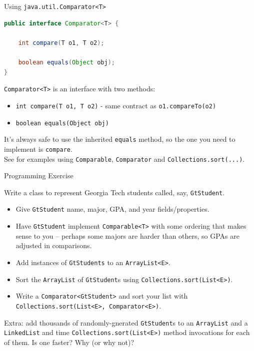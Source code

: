 \documentclass{beamer}
\begin{document}
\begin{frame}[fragile]{Using {\tt java.util.Comparator<T>}}


\begin{lstlisting}[language=Java]
public interface Comparator<T> {

    int compare(T o1, T o2);

    boolean equals(Object obj);
}

\end{lstlisting}

{\tt Comparator<T>} is an interface with two methods:
\begin{itemize}
\item {\tt int compare(T o1, T o2)} -  same contract as {\tt o1.compareTo(o2)}
\item {\tt boolean equals(Object obj)}
\end{itemize}
It's always safe to use the inherited {\tt equals} method, so the one you need to implement is {\tt compare}.\\

See  for examples using {\tt Comparable}, {\tt Comparator} and {\tt Collections.sort(...)}.

\end{frame}


\begin{frame}[fragile]{Programming Exercise}

Write a class to represent Georgia Tech students called, say, {\tt GtStudent}.
\begin{itemize}
\item Give {\tt GtStudent} name, major, GPA, and year fields/properties.
\item Have {\tt GtStudent} implement {\tt Comparable<T>} with some ordering that makes sense to you -- perhaps some majors are harder than others, so GPAs are adjusted in comparisons.
\item Add instances of {\tt GtStudents} to an {\tt ArrayList<E>}.
\item Sort the {\tt ArrayList} of {\tt GtStudent}s using {\tt Collections.sort(List<E>)}.
\item Write a {\tt Comparator<GtStudent>} and sort your list with {\tt Collections.sort(List<E>, Comparator<E>)}.
\end{itemize}
Extra: add thousands of randomly-gnerated {\tt GtStudent}s to an {\tt ArrayList} and a {\tt LinkedList} and time {\tt Collections.sort(List<E>)} method invocations for each of them.  Is one faster?  Why (or why not)?

\end{frame}
\end{document}
